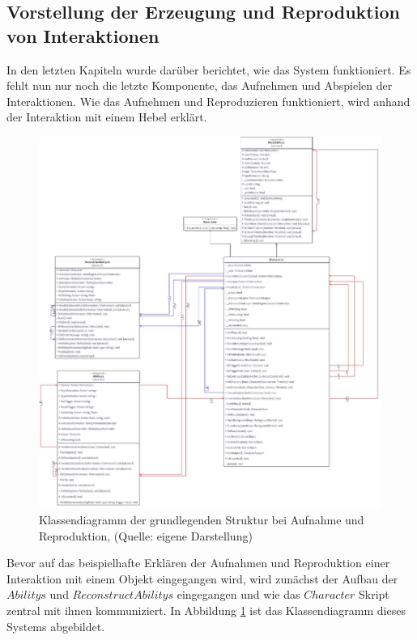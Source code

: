 \subsection{Vorstellung der Erzeugung und Reproduktion von Interaktionen}\label{sec:interactions_reproduction}
In den letzten Kapiteln wurde darüber berichtet, wie das System funktioniert. Es fehlt nun nur noch die letzte Komponente, das Aufnehmen und Abspielen der Interaktionen. Wie das Aufnehmen und Reproduzieren funktioniert, wird anhand der Interaktion mit einem Hebel erklärt.

\begin{figure}[ht]
\centering
\includegraphics[width=1\linewidth]{content/pictures/Interaction_Reconstruct_class.jpg}
\caption{Klassendiagramm der grundlegenden Struktur bei Aufnahme und Reproduktion, (Quelle: eigene Darstellung)}
\label{fig:record_reconstruct_class}
\end{figure}

Bevor auf das beispielhafte Erklären der Aufnahmen und Reproduktion einer Interaktion mit einem Objekt eingegangen wird, wird zunächst der Aufbau der $Abilitys$ und $ReconstructAbilitys$ eingegangen und wie das $Character$ Skript zentral mit ihnen kommuniziert. In Abbildung \ref{fig:record_reconstruct_class} ist das Klassendiagramm dieses Systems abgebildet.

